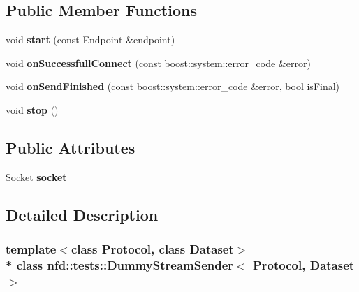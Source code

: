 \subsection*{Public Member Functions}
\begin{DoxyCompactItemize}
\item 
void {\bfseries start} (const Endpoint \&endpoint)\hypertarget{classnfd_1_1tests_1_1DummyStreamSender_aadd6294df84176ab34e5169bebd64fc7}{}\label{classnfd_1_1tests_1_1DummyStreamSender_aadd6294df84176ab34e5169bebd64fc7}

\item 
void {\bfseries on\+Successfull\+Connect} (const boost\+::system\+::error\+\_\+code \&error)\hypertarget{classnfd_1_1tests_1_1DummyStreamSender_ad48e342337950f69c5dd56ba2b5a79e4}{}\label{classnfd_1_1tests_1_1DummyStreamSender_ad48e342337950f69c5dd56ba2b5a79e4}

\item 
void {\bfseries on\+Send\+Finished} (const boost\+::system\+::error\+\_\+code \&error, bool is\+Final)\hypertarget{classnfd_1_1tests_1_1DummyStreamSender_af3093a75502223b705248f26ee910474}{}\label{classnfd_1_1tests_1_1DummyStreamSender_af3093a75502223b705248f26ee910474}

\item 
void {\bfseries stop} ()\hypertarget{classnfd_1_1tests_1_1DummyStreamSender_a099f14c7a8e71fafd86cd78fb0d16acb}{}\label{classnfd_1_1tests_1_1DummyStreamSender_a099f14c7a8e71fafd86cd78fb0d16acb}

\end{DoxyCompactItemize}
\subsection*{Public Attributes}
\begin{DoxyCompactItemize}
\item 
Socket {\bfseries socket}\hypertarget{classnfd_1_1tests_1_1DummyStreamSender_af2f00102dec7a5b4a7a40e2230023510}{}\label{classnfd_1_1tests_1_1DummyStreamSender_af2f00102dec7a5b4a7a40e2230023510}

\end{DoxyCompactItemize}


\subsection{Detailed Description}
\subsubsection*{template$<$class Protocol, class Dataset$>$\\*
class nfd\+::tests\+::\+Dummy\+Stream\+Sender$<$ Protocol, Dataset $>$}




